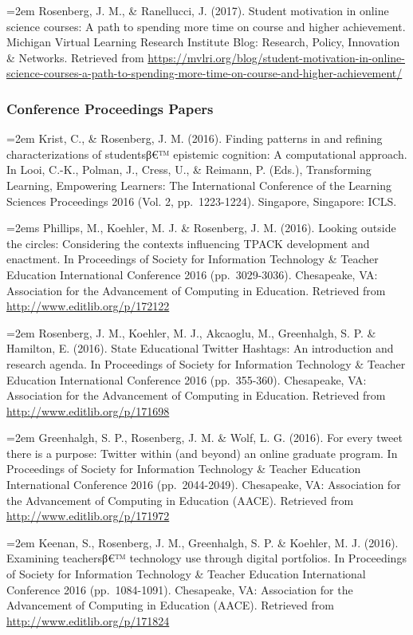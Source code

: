\documentclass[]{article}
\newcommand{\euro}{€}
\begin{document}
\hangindent=2em Rosenberg, J. M., \& Ranellucci, J. (2017). Student
motivation in online science courses: A path to spending more time on
course and higher achievement. Michigan Virtual Learning Research
Institute Blog: Research, Policy, Innovation \& Networks. Retrieved from
\url{https://mvlri.org/blog/student-motivation-in-online-science-courses-a-path-to-spending-more-time-on-course-and-higher-achievement/}

\subsubsection{Conference Proceedings
Papers}\label{conference-proceedings-papers}

\hangindent=2em Krist, C., \& Rosenberg, J. M. (2016). Finding patterns
in and refining characterizations of studentsβ\euro{}™ epistemic
cognition: A computational approach. In Looi, C.-K., Polman, J., Cress,
U., \& Reimann, P. (Eds.), Transforming Learning, Empowering Learners:
The International Conference of the Learning Sciences Proceedings 2016
(Vol. 2, pp.~1223-1224). Singapore, Singapore: ICLS.

\hangindent=2ems Phillips, M., Koehler, M. J. \& Rosenberg, J. M.
(2016). Looking outside the circles: Considering the contexts
influencing TPACK development and enactment. In Proceedings of Society
for Information Technology \& Teacher Education International Conference
2016 (pp.~3029-3036). Chesapeake, VA: Association for the Advancement of
Computing in Education. Retrieved from
\url{http://www.editlib.org/p/172122}

\hangindent=2em Rosenberg, J. M., Koehler, M. J., Akcaoglu, M.,
Greenhalgh, S. P. \& Hamilton, E. (2016). State Educational Twitter
Hashtags: An introduction and research agenda. In Proceedings of Society
for Information Technology \& Teacher Education International Conference
2016 (pp.~355-360). Chesapeake, VA: Association for the Advancement of
Computing in Education. Retrieved from
\url{http://www.editlib.org/p/171698}

\hangindent=2em Greenhalgh, S. P., Rosenberg, J. M. \& Wolf, L. G.
(2016). For every tweet there is a purpose: Twitter within (and beyond)
an online graduate program. In Proceedings of Society for Information
Technology \& Teacher Education International Conference 2016
(pp.~2044-2049). Chesapeake, VA: Association for the Advancement of
Computing in Education (AACE). Retrieved from
\url{http://www.editlib.org/p/171972}

\hangindent=2em Keenan, S., Rosenberg, J. M., Greenhalgh, S. P. \&
Koehler, M. J. (2016). Examining teachersβ\euro{}™ technology use
through digital portfolios. In Proceedings of Society for Information
Technology \& Teacher Education International Conference 2016
(pp.~1084-1091). Chesapeake, VA: Association for the Advancement of
Computing in Education (AACE). Retrieved from
\url{http://www.editlib.org/p/171824}
\end{document}

